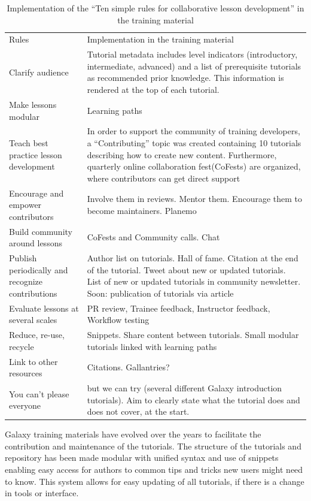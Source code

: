 \documentclass[10pt,letterpaper]{article}
\begin{document}
\begin{table}[]
	\centering
	\caption{Implementation of the ``Ten simple rules for collaborative lesson development''\cite{Devenyi_2018} in the training material
    \label{tbl:tensimplerules}}
	\begin{tabular}{p{}p{}}
		Rules & Implementation in the training material \\
		Clarify audience & Tutorial metadata includes level indicators (introductory, intermediate, advanced) and a list of prerequisite tutorials as recommended prior knowledge. This information is rendered at the top of each tutorial. \\
		Make lessons modular & Learning paths \\
		Teach best practice lesson development & In order to support the community of training developers, a ``Contributing'' topic was created containing 10 tutorials describing how to create new content. Furthermore, quarterly online collaboration fest(CoFests) are organized, where contributors can get direct support  \\
		Encourage and empower contributors & Involve them in reviews. Mentor them. Encourage them to become maintainers. Planemo \\
		Build community around lessons & CoFests and Community calls. Chat \\
		Publish periodically and recognize contributions & Author list on tutorials. Hall of fame. Citation at the end of the tutorial. Tweet about new or updated tutorials. List of new or updated tutorials in community newsletter. Soon: publication of tutorials via article \\
		Evaluate lessons at several scales & PR review, Trainee feedback, Instructor feedback, Workflow testing \\
		Reduce, re-use, recycle & Snippets. Share content between tutorials. Small modular tutorials linked with learning paths \\
		Link to other resources & Citations. Gallantries? \\
		You can't please everyone & but we can try (several different Galaxy introduction tutorials). Aim to clearly state what the tutorial does and does not cover, at the start.  \\
	\end{tabular}
\end{table}

Galaxy training materials have evolved over the years to facilitate the contribution and maintenance of the tutorials.
The structure of the tutorials and repository has been made modular with unified syntax and use of snippets enabling easy access for authors to common tips and tricks new users might need to know.
This system allows for easy updating of all tutorials, if there is a change in tools or interface.
\end{document}
